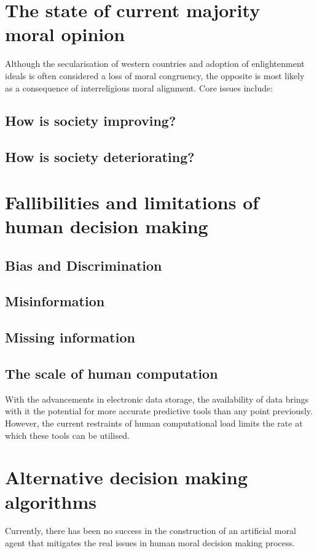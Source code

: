 \section{The state of current majority moral opinion}
Although the secularisation of western countries and adoption of enlightenment ideals is often considered a loss of moral congruency, the opposite is most likely as a consequence of interreligious moral alignment.
Core issues include:

\subsection{How is society improving?}

\subsection{How is society deteriorating?}

\section{Fallibilities and limitations of human decision making}
\subsection{Bias and Discrimination}
\subsection{Misinformation}
\subsection{Missing information}
\subsection{The scale of human computation}
With the advancements in electronic data storage, the availability of data brings with it the potential for more accurate predictive tools than any point previously.
However, the current restraints of human computational load limits the rate at which these tools can be utilised.

\section{Alternative decision making algorithms}
Currently, there has been no success in the construction of an artificial moral agent that mitigates the real issues in human moral decision making process.
